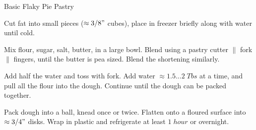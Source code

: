 \begin{recipe}[
preparationtime = 1 hour 30 minutes,
source = \citefield{pie2004}{title} \cite{pie2004}
]
{Basic Flaky Pie Pastry\label{basicFlakyPiePastry}}


\preparation
{
\step Cut fat into small pieces ($\approx 3/8"$ cubes), place in freezer briefly along with water until cold.

\step Mix flour, sugar, salt, butter, in a large bowl.
Blend using a pastry cutter $\|$ fork $\|$ fingers, until the butter is pea sized.
Blend the shortening similarly.

\step Add half the water and toss with fork.
Add water $\approx 1.5...2\; Tbs$ at a time, and pull all the flour into the dough.
Continue until the dough can be packed together.

\step Pack dough into a ball, knead once or twice.
Flatten onto a floured surface into $\approx 3/4"$ disks.
Wrap in plastic and refrigerate at least $1\; hour$ or overnight.
}


\end{recipe}
